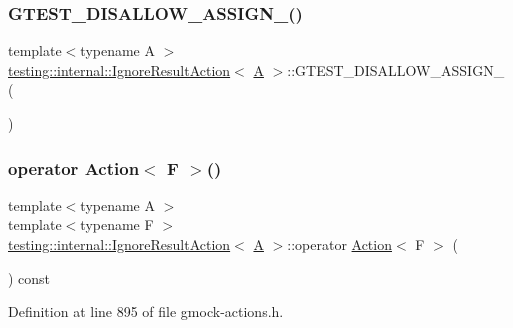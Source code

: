 \subsubsection{\texorpdfstring{G\+T\+E\+S\+T\+\_\+\+D\+I\+S\+A\+L\+L\+O\+W\+\_\+\+A\+S\+S\+I\+G\+N\+\_\+()}{GTEST\_DISALLOW\_ASSIGN\_()}}
{\footnotesize\ttfamily template$<$typename A $>$ \\
\hyperlink{classtesting_1_1internal_1_1IgnoreResultAction}{testing\+::internal\+::\+Ignore\+Result\+Action}$<$ \hyperlink{namespacetesting_a5e9134d655d2fc9323902348083282e7}{A} $>$\+::G\+T\+E\+S\+T\+\_\+\+D\+I\+S\+A\+L\+L\+O\+W\+\_\+\+A\+S\+S\+I\+G\+N\+\_\+ (\begin{DoxyParamCaption}\item[{\hyperlink{classtesting_1_1internal_1_1IgnoreResultAction}{Ignore\+Result\+Action}$<$ \hyperlink{namespacetesting_a5e9134d655d2fc9323902348083282e7}{A} $>$}]{ }\end{DoxyParamCaption})\hspace{0.3cm}{\ttfamily [private]}}

\mbox{\label{classtesting_1_1internal_1_1IgnoreResultAction_affb8b7439604c860e1416f45339c6e37}} 
\subsubsection{\texorpdfstring{operator Action$<$ F $>$()}{operator Action< F >()}}
{\footnotesize\ttfamily template$<$typename A $>$ \\
template$<$typename F $>$ \\
\hyperlink{classtesting_1_1internal_1_1IgnoreResultAction}{testing\+::internal\+::\+Ignore\+Result\+Action}$<$ \hyperlink{namespacetesting_a5e9134d655d2fc9323902348083282e7}{A} $>$\+::operator \hyperlink{classtesting_1_1Action}{Action}$<$ F $>$ (\begin{DoxyParamCaption}{ }\end{DoxyParamCaption}) const\hspace{0.3cm}{\ttfamily [inline]}}



Definition at line 895 of file gmock-\/actions.\+h.


